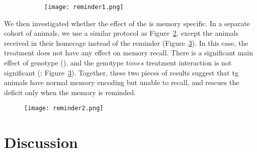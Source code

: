 \begin{figure}[h]
    \begin{subfigure}[h]{\textwidth}
        \texttt{[image: reminder1.png]}
        \caption{\label{f.ad.actf}}
    \end{subfigure}
    \caption{ \label{f.ad.reminder1}}
\end{figure}

We then investigated whether the effect of the \tglu is memory specific. In a separate cohort of animals, we use a similar protocol as Figure~\ref{f.ad.reminder1}, except the animals received \tglu in their homecage instead of the reminder (Figure~\ref{f.ad.reminder2}). In this case, the \tglu treatment does not have any effect on memory recall. There is a significant main effect of genotype (), and the genotype $times$ treatment interaction is not significant (; Figure~\ref{f.ad.reminder2}). Together, these two pieces of results suggest that \gls{tg} animals have normal memory encoding but unable to recall, and \tglu rescues the deficit only when the memory is reminded.


\begin{figure}[h]
    \texttt{[image: reminder2.png]}
    \caption{\label{f.ad.reminder2}}
\end{figure}

\section{Discussion}
